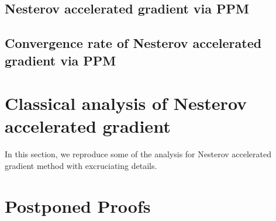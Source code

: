 \documentclass[12pt]{article}
\begin{document}
    \subsection{Nesterov accelerated gradient via PPM}
    \subsection{Convergence rate of Nesterov accelerated gradient via PPM}

\section{Classical analysis of Nesterov accelerated gradient}
    In this section, we reproduce some of the analysis for Nesterov accelerated gradient method with excruciating details. 


\printbibliography

\appendix
\section*{Postponed Proofs}
\end{document}
